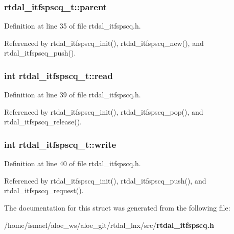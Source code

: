 \subsubsection[{parent}]{ rtdal\-\_\-itfspscq\-\_\-t\-::parent}\label{structrtdal__itfspscq__t_aed92982a615adbe1ae3d1e149faf382f}


Definition at line 35 of file rtdal\-\_\-itfspscq.\-h.



Referenced by rtdal\-\_\-itfspscq\-\_\-init(), rtdal\-\_\-itfspscq\-\_\-new(), and rtdal\-\_\-itfspscq\-\_\-push().

\subsubsection[{read}]{\setlength{\rightskip}{0pt plus 5cm}int rtdal\-\_\-itfspscq\-\_\-t\-::read}\label{structrtdal__itfspscq__t_a8c184b2163d17ecbe3ebb4190314e427}


Definition at line 39 of file rtdal\-\_\-itfspscq.\-h.



Referenced by rtdal\-\_\-itfspscq\-\_\-init(), rtdal\-\_\-itfspscq\-\_\-pop(), and rtdal\-\_\-itfspscq\-\_\-release().

\subsubsection[{write}]{\setlength{\rightskip}{0pt plus 5cm}int rtdal\-\_\-itfspscq\-\_\-t\-::write}\label{structrtdal__itfspscq__t_a41d853b973164484c80ee9125e4178d1}


Definition at line 40 of file rtdal\-\_\-itfspscq.\-h.



Referenced by rtdal\-\_\-itfspscq\-\_\-init(), rtdal\-\_\-itfspscq\-\_\-push(), and rtdal\-\_\-itfspscq\-\_\-request().



The documentation for this struct was generated from the following file\-:\begin{DoxyCompactItemize}
\item 
/home/ismael/aloe\-\_\-ws/aloe\-\_\-git/rtdal\-\_\-lnx/src/{\bf rtdal\-\_\-itfspscq.\-h}\end{DoxyCompactItemize}

